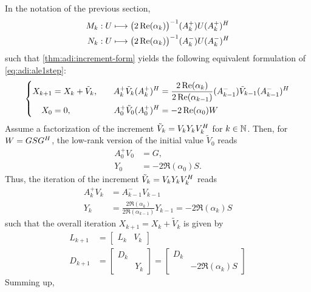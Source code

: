 In the notation of the previous section,
\begin{equation}
\label{eq:adi:ale:MN}
\begin{aligned}
  M_k &: U \longmapsto \big( 2\operatorname{Re}(\alpha_k) \big)^{-1} (A_k^+) U (A_k^+)^H \\
  N_k &: U \longmapsto \big( 2\operatorname{Re}(\alpha_k) \big)^{-1} (A_k^-) U (A_k^-)^H
\end{aligned}
\end{equation}
such that \autoref{thm:adi:increment-form} yields the following equivalent formulation of \eqref{eq:adi:ale1step}:
\begin{equation}
\left\{
\begin{aligned}
  X_{k+1}
    &= X_k + \tilde V_k, &
  \quad %
  A_k^+ \tilde V_k (A_k^+)^\HT
    &= \frac{2\Re(\alpha_k)}{2\Re(\alpha_{k-1})}
      (A_{k-1}^-) \tilde V_{k-1} (A_{k-1}^-)^\HT \\
  X_0
    &= 0, &
  A_0^+ \tilde V_0 (A_0^+)^\HT
    &= -2\Re(\alpha_0) W
\end{aligned}
\right.
\end{equation}
Assume a factorization of the increment $\tilde V_k = V_k Y_k V_k^H$ for $k\in\mathbb{N}$.
Then, for $W = GSG^H$,
the low-rank version of the initial value $\tilde V_0$ reads
\begin{align*}
  A_0^+ V_0 &= G, \\
  Y_0 &= -2\Re(\alpha_0) S.
\end{align*}
Thus,
the iteration of the increment $\tilde V_{k} = V_k Y_k V_k^H$ reads
\begin{align*}
  A_k^+ V_k &= A_{k-1}^- V_{k-1} \\
  Y_k &= \frac{2\Re(\alpha_k)}{2\Re(\alpha_{k-1})} Y_{k-1}
  = -2\Re(\alpha_k) S
\end{align*}
such that the overall iteration $X_{k+1} = X_k + \tilde V_k$ is given by
\begin{align*}
  L_{k+1} &= \begin{bmatrix}
    L_k &
    V_k
  \end{bmatrix} \\
    D_{k+1} &= \begin{bmatrix}
      D_k \\
      & Y_k
    \end{bmatrix}
    = \begin{bmatrix}
      D_k \\
      & -2\Re(\alpha_k) S
    \end{bmatrix}
\end{align*}
Summing up,
